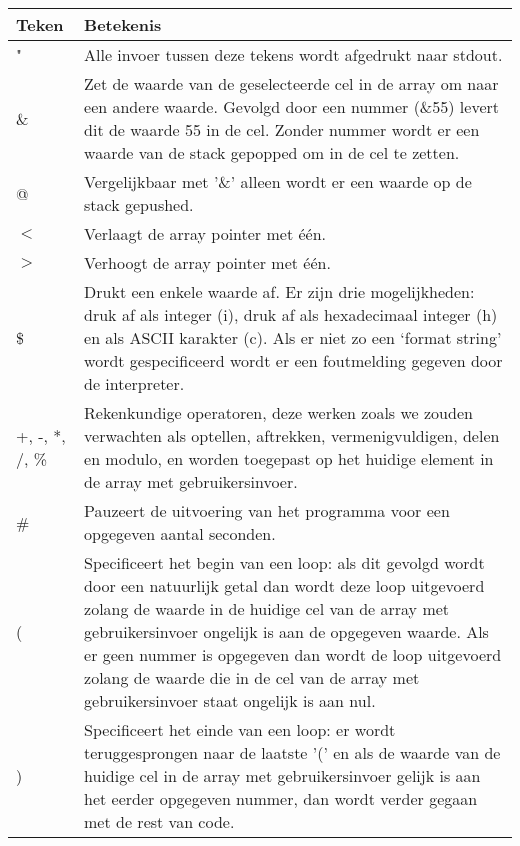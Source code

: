 \documentclass[11pt]{article}
\begin{document}
\begin{center}
    \begin{tabular}{ | l | p{15cm} |}
    \hline
    Teken & Betekenis \\ \hline
    " & Alle invoer tussen deze tekens wordt afgedrukt naar stdout. \\ \hline
    \& & Zet de waarde van de geselecteerde cel in de array om naar een andere waarde. Gevolgd door een nummer (\&55) levert dit de waarde 55 in de cel. Zonder nummer wordt er een waarde van de stack gepopped om in de cel te zetten. \\ \hline
    @ & Vergelijkbaar met '\&' alleen wordt er een waarde op de stack gepushed. \\ \hline
    \(<\) & Verlaagt de array pointer met \'e\'en. \\ \hline
    \(>\) & Verhoogt de array pointer met \'e\'en. \\ \hline
    \$ & Drukt een enkele waarde af. Er zijn drie mogelijkheden: druk af als integer (i), druk af als hexadecimaal integer (h) en als ASCII karakter (c). Als er niet zo een `format string' wordt gespecificeerd wordt er een foutmelding gegeven door de interpreter. \\ \hline
    +, -, *, /, \% & Rekenkundige operatoren, deze werken zoals we zouden verwachten als optellen, aftrekken, vermenigvuldigen, delen en modulo, en worden toegepast op het huidige element in de array met gebruikersinvoer. \\ \hline
    \# & Pauzeert de uitvoering van het programma voor een opgegeven aantal seconden. \\ \hline
    ( & Specificeert het begin van een loop: als dit gevolgd wordt door een natuurlijk getal dan wordt deze loop uitgevoerd zolang de waarde in de huidige cel van de array met gebruikersinvoer ongelijk is aan de opgegeven waarde. Als er geen nummer is opgegeven dan wordt de loop uitgevoerd zolang de waarde die in de cel van de array met gebruikersinvoer staat ongelijk is aan nul. \\ \hline
    ) & Specificeert het einde van een loop: er wordt teruggesprongen naar de laatste '(' en als de waarde van de huidige cel in de array met gebruikersinvoer gelijk is aan het eerder opgegeven nummer, dan wordt verder gegaan met de rest van code. \\ \hline
  

    \hline
    \end{tabular}
\end{center}
\end{document}
